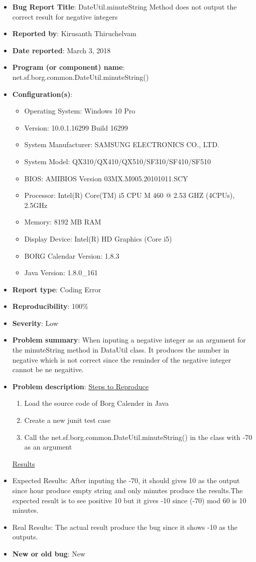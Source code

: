 \documentclass[fontsize=12pt,paper=letter,twoside]{scrartcl}
\begin{document}
\begin{itemize}
\begin{itemize}
\item \textbf{Bug Report Title}: DateUtil.minuteString Method does not output the correct result for negative integers
\item \textbf{Reported by}: Kirusanth Thiruchelvam
\item \textbf{Date reported}: March 3, 2018
\item \textbf{Program (or component) name}: net.sf.borg.common.DateUtil.minuteString()
\item \textbf{Configuration(s)}:
\begin{itemize}
\item Operating System: Windows 10 Pro 
\item Version: 10.0.1.16299 Build 16299
\item System Manufacturer: SAMSUNG ELECTRONICS CO., LTD.
\item System Model: QX310/QX410/QX510/SF310/SF410/SF510
\item BIOS: AMIBIOS Version 03MX.M005.20101011.SCY 
\item Processor: Intel(R) Core(TM) i5 CPU   M 460   @ 2.53 GHZ (4CPUs), ~ 2.5GHz
\item Memory: 8192 MB RAM
\item Display Device: Intel(R) HD Graphics (Core i5)
\item BORG Calendar Version: 1.8.3
\item Java Version: 1.8.0\_161
\end{itemize}
\item \textbf{Report type}: Coding Error
\item \textbf{Reproducibility}: 100\%
\item \textbf{Severity}: Low
\item \textbf{Problem summary}: When inputing a negative integer as an argument for the minuteString method in DataUtil class. It produces the number in negative which is not correct since the reminder of the negative integer cannot be ne negaitive.
\item \textbf{Problem description}:\newline
\underline{Steps to Reproduce}
\begin{enumerate}
\item Load the source code of Borg Calender in Java
 \item Create a new junit test case
 \item Call the net.sf.borg.common.DateUtil.minuteString() in the class with -70 as an argument
\end {enumerate}
 \underline{ Results}
\item Expected Results: After inputing the -70, it should gives 10 as the output since hour produce empty string and only minutes produce the results.The expected result is to see positive 10 but it gives -10 since (-70) mod 60 is 10 minutes.
\item Real Results: The actual result produce the bug since it shows -10 as the outputs.
\item \textbf{New or old bug}: New
\end{itemize}

\end{itemize}
\end{document}
